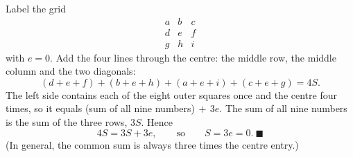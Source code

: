 Label the grid
\[\begin{array}{ccc}a&b&c\\ d&e&f\\ g&h&i\end{array}\]
with $e=0$. Add the four lines through the centre: the middle row, the middle column and the two diagonals:
\[(d+e+f)+(b+e+h)+(a+e+i)+(c+e+g)=4S.\]
The left side contains each of the eight outer squares once and the centre four times, so it equals (sum of all nine numbers)$\,+\,3e$. The sum of all nine numbers is the sum of the three rows, $3S$. Hence
\[4S=3S+3e,\qquad\text{so}\qquad S=3e=0.\ \blacksquare\]
(In general, the common sum is always three times the centre entry.)
